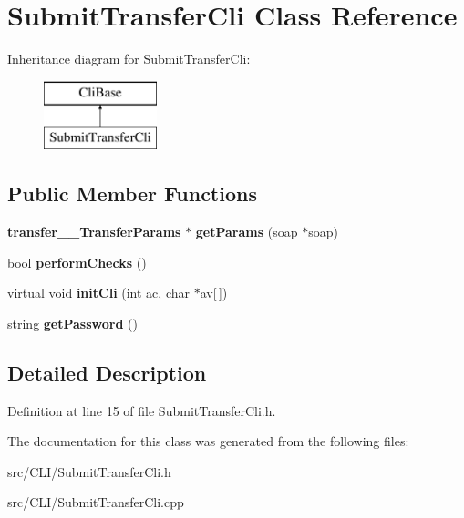 \section{SubmitTransferCli Class Reference}
\label{classSubmitTransferCli}
Inheritance diagram for SubmitTransferCli:\begin{figure}[H]
\begin{center}
\leavevmode
\includegraphics[height=2.000000cm]{classSubmitTransferCli}
\end{center}
\end{figure}
\subsection*{Public Member Functions}
\begin{DoxyCompactItemize}
\item 
{\bf transfer\_\-\_\-TransferParams} $\ast$ {\bfseries getParams} (soap $\ast$soap)\label{classSubmitTransferCli_a5218c8eae866bfeb32ed473d816f3b05}

\item 
bool {\bfseries performChecks} ()\label{classSubmitTransferCli_a33e8547c18b952b96a052eb546f0fc08}

\item 
virtual void {\bfseries initCli} (int ac, char $\ast$av[$\,$])\label{classSubmitTransferCli_ae6dc89c8f7ed9ada6d398195617d9f64}

\item 
string {\bfseries getPassword} ()\label{classSubmitTransferCli_ab3aa66652d42f9ec6953e3bd928f60f6}

\end{DoxyCompactItemize}


\subsection{Detailed Description}


Definition at line 15 of file SubmitTransferCli.h.



The documentation for this class was generated from the following files:\begin{DoxyCompactItemize}
\item 
src/CLI/SubmitTransferCli.h\item 
src/CLI/SubmitTransferCli.cpp\end{DoxyCompactItemize}
